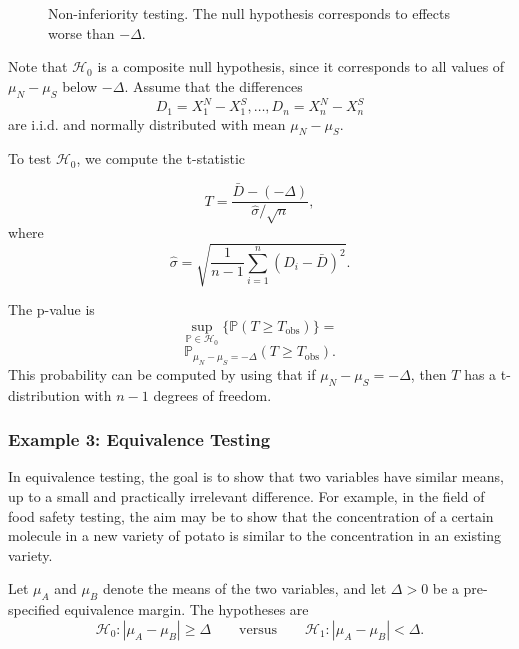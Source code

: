 \documentclass[11pt]{article}
\theoremstyle{plain}
\theoremstyle{definition}
\newcommand{\Hy}{\mathcal{H}}
\newcommand{\pr}{\mathbb{P}}
\begin{document}
\begin{figure}[h]
\centering
{}
\caption{Non-inferiority testing. The null hypothesis corresponds to effects worse than $-\Delta$.}
\label{fig:noninferiority}
\end{figure}

Note that $\Hy_0$ is a composite null hypothesis, since it corresponds to all values of $\mu_N-\mu_S$ below $-\Delta$. Assume that the differences 
$$D_1=X^N_1-X^S_1,\ldots,D_n=X^N_n-X^S_n$$ 
are i.i.d. and normally distributed with mean $\mu_N-\mu_S$.

To test $\Hy_0$, we compute the t-statistic

$$T=\frac{\bar{D}-(-\Delta)}{\hat{\sigma}/\sqrt{n}},$$
where $$\hat{\sigma} = \sqrt{\frac{1}{n-1} \sum_{i=1}^n( D_i - \bar{D})^2}.$$

The p-value is 
$$\sup_{\pr\in\Hy_0}\{\pr(T\geq T_{\text{obs}})\}=$$
$$\pr_{\mu_N-\mu_S=-\Delta}(T\geq T_{\text{obs}}).$$
This probability can be computed by using that if $\mu_N-\mu_S=-\Delta$, then $T$ has a t-distribution with $n-1$ degrees of freedom.




\subsubsection{Example 3: Equivalence Testing} \label{secequiv}

In equivalence testing, the goal is to show that two variables have similar means, up to a small and practically irrelevant difference. For example, in the field of food safety testing, the aim may be to show that the concentration of a certain molecule in a new variety of potato is similar to the concentration in an existing variety.

Let $\mu_A$ and $\mu_B$ denote the means of the two variables, and let $\Delta > 0$ be a pre-specified equivalence margin. The hypotheses are
\[
\Hy_0: |\mu_A - \mu_B| \ge \Delta
\qquad \text{versus} \qquad
\Hy_1: |\mu_A - \mu_B| < \Delta.
\]
\end{document}
